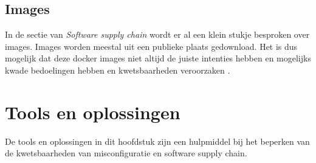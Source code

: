 \subsection{Images}
In de sectie van \textit{Software supply chain} wordt er al een klein stukje besproken over images. Images worden meestal uit een publieke plaats gedownload. Het is dus mogelijk dat deze docker images niet altijd de juiste intenties hebben en mogelijks kwade bedoelingen hebben en kwetsbaarheden veroorzaken \autocite{mytilinakis2020attack}. 


\section{Tools en oplossingen}

De tools en oplossingen in dit hoofdstuk zijn een hulpmiddel bij het beperken van de kwetsbaarheden van misconfiguratie en software supply chain. 











